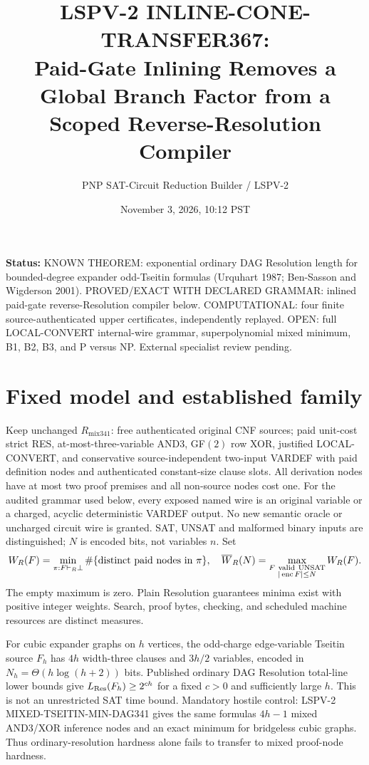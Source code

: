 \documentclass[11pt]{article}
\title{LSPV-2 INLINE-CONE-TRANSFER367:\\Paid-Gate Inlining Removes a Global Branch Factor from a Scoped Reverse-Resolution Compiler}
\author{PNP SAT-Circuit Reduction Builder / LSPV-2}
\date{November 3, 2026, 10:12 PST}
\begin{document}
\maketitle
\noindent\textbf{Status:} KNOWN THEOREM: exponential ordinary DAG Resolution length for bounded-degree expander odd-Tseitin formulas (Urquhart 1987; Ben-Sasson and Wigderson 2001). PROVED/EXACT WITH DECLARED GRAMMAR: inlined paid-gate reverse-Resolution compiler below. COMPUTATIONAL: four finite source-authenticated upper certificates, independently replayed. OPEN: full LOCAL-CONVERT internal-wire grammar, superpolynomial mixed minimum, B1, B2, B3, and P versus NP. External specialist review pending.

\section*{Fixed model and established family}
Keep unchanged $R_{\mathrm{mix341}}$: free authenticated original CNF sources; paid unit-cost strict RES, at-most-three-variable AND3, GF$(2)$ row XOR, justified LOCAL-CONVERT, and conservative source-independent two-input VARDEF with paid definition nodes and authenticated constant-size clause slots. All derivation nodes have at most two proof premises and all non-source nodes cost one. For the audited grammar used below, every exposed named wire is an original variable or a charged, acyclic deterministic VARDEF output. No new semantic oracle or uncharged circuit wire is granted. SAT, UNSAT and malformed binary inputs are distinguished; $N$ is encoded bits, not variables $n$. Set
\[
W_R(F)=\min_{\pi:F\vdash_R\bot}\#\{\hbox{distinct paid nodes in }\pi\},
\quad
\overline W_R(N)=\max_{\substack{F\ {\rm valid\ UNSAT}\\|\operatorname{enc}F|\le N}}W_R(F).
\]
The empty maximum is zero. Plain Resolution guarantees minima exist with positive integer weights. Search, proof bytes, checking, and scheduled machine resources are distinct measures.

For cubic expander graphs on $h$ vertices, the odd-charge edge-variable Tseitin source $F_h$ has $4h$ width-three clauses and $3h/2$ variables, encoded in $N_h=\Theta(h\log(h+2))$ bits. Published ordinary DAG Resolution total-line lower bounds give $L_{\rm Res}(F_h)\ge2^{ch}$ for a fixed $c>0$ and sufficiently large $h$. This is not an unrestricted SAT time bound. Mandatory hostile control: LSPV-2 MIXED-TSEITIN-MIN-DAG341 gives the same formulas $4h-1$ mixed AND3/XOR inference nodes and an exact minimum for bridgeless cubic graphs. Thus ordinary-resolution hardness alone fails to transfer to mixed proof-node hardness.
\end{document}
